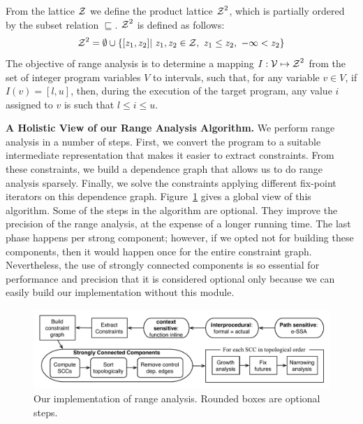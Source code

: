 \documentclass{paper}
\newcommand{\varset}[1]{\mbox{$\cal{#1}$}}
\begin{document}
From the lattice $\varset{Z}$ we define the product lattice
$\varset{Z}^2$, which is partially ordered by the subset relation
$\sqsubseteq$.
$\varset{Z}^2$ is defined as follows:
%
\begin{equation*}
\varset{Z}^2 = \emptyset \cup \{[z_1, z_2] | \ z_1,z_2 \in \varset{Z},
\ z_1 \leq z_2, \  -\infty < z_2 \}
\end{equation*}
%
The objective of range analysis is to determine a mapping
$I: \varset{V} \mapsto \varset{Z}^2$ from the set of integer program variables
$V$ to intervals, such that, for any variable $v \in V$, if
$I(v) = [l, u]$, then, during the execution of the target program, any
value $i$ assigned to $v$ is such that $l \leq i \leq u$.

\noindent
\textbf{A Holistic View of our Range Analysis Algorithm.}
We perform range analysis in a number of steps.
First, we convert the program to a suitable intermediate representation that
makes it easier to extract constraints.
From these constraints, we build a dependence graph that allows us to do
range analysis sparsely.
Finally, we solve the constraints applying different fix-point iterators on
this dependence graph.
Figure~\ref{fig:algorithm} gives a global view of this algorithm.
Some of the steps in the algorithm are optional.
They improve the precision of the range analysis, at the expense of a longer
running time.
The last phase happens per strong component; however, if we opted not for building 
these components, then it would happen once for the entire constraint graph.
Nevertheless, the use of strongly connected components
is so essential for performance and precision that it is considered optional only because we
can easily build our implementation without this module.


\begin{figure}[h]
\begin{center}
\includegraphics[width=\textwidth]{images/algorithm}
\end{center}
\caption{\label{fig:algorithm}
Our implementation of range analysis. Rounded boxes are optional steps.}
\end{figure}
\end{document}
